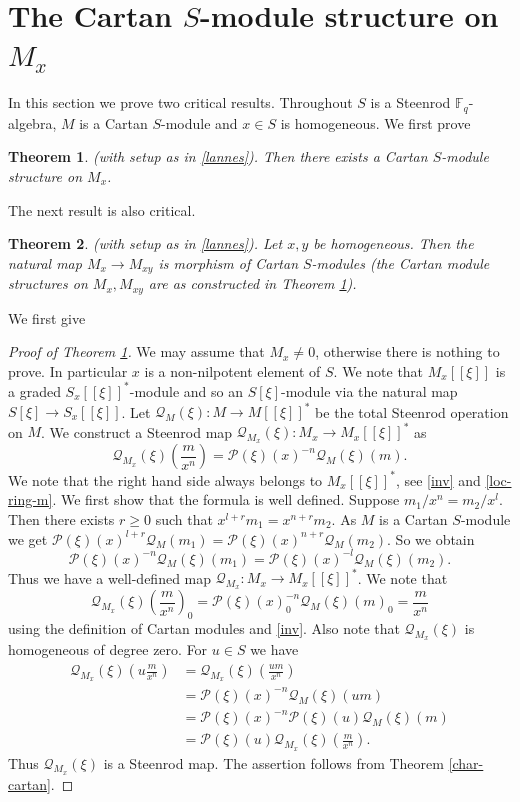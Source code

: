 \documentclass{amsart}
\newcommand{\F}{\mathbb{F} }
\newcommand{\Pc}{\mathcal{P} }
\newcommand{\Qc}{\mathcal{Q} }
\newcommand{\rt}{\rightarrow}
\theoremstyle{plain}
\newtheorem{theorem}{Theorem}[section]
\theoremstyle{definition}
\theoremstyle{remark}
\begin{document}
\section{The Cartan $S$-module structure on $M_x$}
In this section we prove two critical results.
Throughout $S$ is a Steenrod $\F_q$-algebra, $M$ is a Cartan $S$-module and $x \in S$ is homogeneous.
 We first prove
\begin{theorem}
\label{loc}(with setup as in \ref{lannes}).  Then there exists a  Cartan $S$-module structure on $M_x$.
\end{theorem}
The next result is also critical.
\begin{theorem}
\label{maps}(with setup as in \ref{lannes}). Let $x, y$ be homogeneous. Then the natural map $M_x \rt M_{xy}$ is morphism of Cartan $S$-modules (the Cartan module structures on $M_x, M_{xy}$ are as constructed in Theorem \ref{loc}).
\end{theorem}
We first give
\begin{proof}[Proof of Theorem \ref{loc}]
We may assume that $M_x\neq 0$, otherwise there is nothing to prove. In particular $x$ is a non-nilpotent element of $S$.
We note that $M_x[[\xi]]$ is a graded  $S_x[[\xi]]^*$-module and so an $S[\xi]$-module via the natural map $S[\xi] \rt S_x[[\xi]]$.
Let $\Qc_M (\xi)\colon M \rt M[[\xi]]^*$ be the total Steenrod operation on $M$.
We construct a Steenrod map $\Qc_{M_x}(\xi) \colon M_x \rt M_x[[\xi]]^*$ as
$$\Qc_{M_x}(\xi)(\frac{m}{x^n})   =  \Pc(\xi)(x)^{-n}\Qc_M(\xi)(m). $$
We note that the right hand side always belongs to $M_x[[\xi]]^*$, see \ref{inv} and \ref{loc-ring-m}.
We first show that the formula is well defined. Suppose $m_1/x^n = m_2/x^l$. Then there exists $r \geq 0$ such that $x^{l+r}m_1 = x^{n+r}m_2$. As $M$ is a Cartan $S$-module we get
$\Pc(\xi)(x)^{l+r}\Qc_M(m_1) = \Pc(\xi)(x)^{n+r}\Qc_M(m_2)$. So we obtain
$$\Pc(\xi)(x)^{-n}\Qc_M(\xi)(m_1) = \Pc(\xi)(x)^{-l}\Qc_M(\xi)(m_2).$$
Thus we have a well-defined map  $\Qc_{M_x} \colon M_x \rt M_x[[\xi]]^*$.
We note that
$$\Qc_{M_x}(\xi)(\frac{m}{x^n})_0 = \Pc(\xi)(x)^{-n}_0\Qc_M(\xi)(m)_0 = \frac{m}{x^n}$$
using the definition of Cartan modules and \ref{inv}. Also  note that $\Qc_{M_x}(\xi)$ is homogeneous of degree zero.
For $u \in S$ we have
\begin{align*}
   \Qc_{M_x}(\xi)(u\frac{m}{x^n})&= \Qc_{M_x}(\xi)(\frac{um}{x^n}) \\
  &= \Pc(\xi)(x)^{-n}\Qc_M(\xi)(um)  \\
  &= \Pc(\xi)(x)^{-n}\Pc(\xi)(u)\Qc_M(\xi)(m) \\
  &= \Pc(\xi)(u)\Qc_{M_x}(\xi)(\frac{m}{x^n}).
\end{align*}
Thus $\Qc_{M_x}(\xi)$ is a Steenrod map. The assertion follows from Theorem \ref{char-cartan}.
\end{proof}
\end{document}
